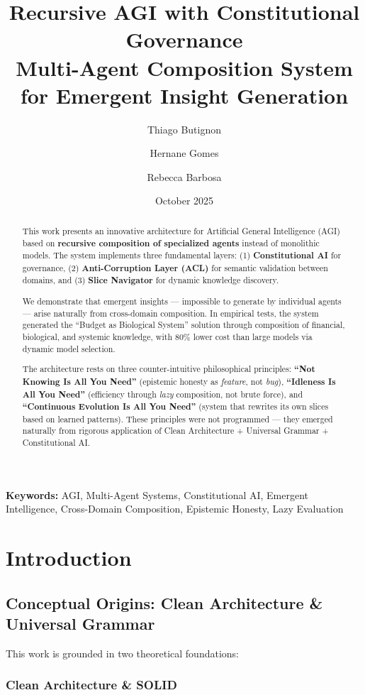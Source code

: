 \documentclass[11pt]{article}
\title{\textbf{Recursive AGI with Constitutional Governance}\\
\large Multi-Agent Composition System for Emergent Insight Generation}
\author{
    Thiago Butignon
    \and
    Hernane Gomes
    \and
    Rebecca Barbosa
}
\date{October 2025}
\begin{document}
\maketitle

\begin{abstract}
This work presents an innovative architecture for Artificial General Intelligence (AGI) based on \textbf{recursive composition of specialized agents} instead of monolithic models. The system implements three fundamental layers: (1) \textbf{Constitutional AI} for governance, (2) \textbf{Anti-Corruption Layer (ACL)} for semantic validation between domains, and (3) \textbf{Slice Navigator} for dynamic knowledge discovery.

We demonstrate that emergent insights --- impossible to generate by individual agents --- arise naturally from cross-domain composition. In empirical tests, the system generated the ``Budget as Biological System'' solution through composition of financial, biological, and systemic knowledge, with 80\% lower cost than large models via dynamic model selection.

The architecture rests on three counter-intuitive philosophical principles: \textbf{``Not Knowing Is All You Need''} (epistemic honesty as \textit{feature}, not \textit{bug}), \textbf{``Idleness Is All You Need''} (efficiency through \textit{lazy} composition, not brute force), and \textbf{``Continuous Evolution Is All You Need''} (system that rewrites its own slices based on learned patterns). These principles were not programmed --- they emerged naturally from rigorous application of Clean Architecture + Universal Grammar + Constitutional AI.
\end{abstract}

\noindent\textbf{Keywords:} AGI, Multi-Agent Systems, Constitutional AI, Emergent Intelligence, Cross-Domain Composition, Epistemic Honesty, Lazy Evaluation

\section{Introduction}

\subsection{Conceptual Origins: Clean Architecture \& Universal Grammar}

This work is grounded in two theoretical foundations:

\subsubsection{Clean Architecture \& SOLID}
\end{document}

